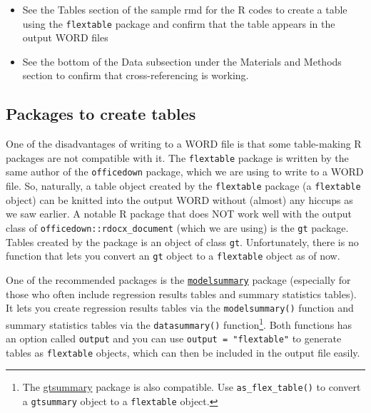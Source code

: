 \documentclass[
  letterpaper,
  DIV=11,
  numbers=noendperiod]{scrreprt}
\providecommand{\tightlist}{%
  \setlength{\itemsep}{0pt}\setlength{\parskip}{0pt}}\usepackage{longtable,booktabs,array}
\begin{document}
\begin{tcolorbox}[enhanced jigsaw, colframe=quarto-callout-note-color-frame, toptitle=1mm, colbacktitle=quarto-callout-note-color!10!white, toprule=.15mm, colback=white, arc=.35mm, bottomtitle=1mm, opacitybacktitle=0.6, breakable, left=2mm, coltitle=black, leftrule=.75mm, title=\textcolor{quarto-callout-note-color}{\faInfo}\hspace{0.5em}{Note}, rightrule=.15mm, titlerule=0mm, opacityback=0, bottomrule=.15mm]

\begin{itemize}
\tightlist
\item
  See the Tables section of the sample rmd for the R codes to create a
  table using the \texttt{flextable} package and confirm that the table
  appears in the output WORD files
\item
  See the bottom of the Data subsection under the Materials and Methods
  section to confirm that cross-referencing is working.
\end{itemize}

\end{tcolorbox}

\hypertarget{packages-to-create-tables}{%
\subsection{Packages to create tables}\label{packages-to-create-tables}}

One of the disadvantages of writing to a WORD file is that some
table-making R packages are not compatible with it. The
\texttt{flextable} package is written by the same author of the
\texttt{officedown} package, which we are using to write to a WORD file.
So, naturally, a table object created by the \texttt{flextable} package
(a \texttt{flextable} object) can be knitted into the output WORD
without (almost) any hiccups as we saw earlier. A notable R package that
does NOT work well with the output class of
\texttt{officedown::rdocx\_document} (which we are using) is the
\texttt{gt} package. Tables created by the package is an object of class
\texttt{gt}. Unfortunately, there is no function that lets you convert
an \texttt{gt} object to a \texttt{flextable} object as of now.

One of the recommended packages is the
\href{https://vincentarelbundock.github.io/modelsummary/index.html}{\texttt{modelsummary}}
package (especially for those who often include regression results
tables and summary statistics tables). It lets you create regression
results tables via the \texttt{modelsummary()} function and summary
statistics tables via the \texttt{datasummary()} function\footnote{The
  \href{https://www.danieldsjoberg.com/gtsummary/index.html}{gtsummary}
  package is also compatible. Use \texttt{as\_flex\_table()} to convert
  a \texttt{gtsummary} object to a \texttt{flextable} object.}. Both
functions has an option called \texttt{output} and you can use
\texttt{output\ =\ "flextable"} to generate tables as \texttt{flextable}
objects, which can then be included in the output file easily.
\end{document}
